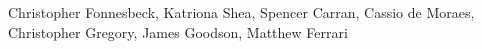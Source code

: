 Christopher Fonnesbeck, Katriona Shea, Spencer Carran, Cassio de Moraes, Christopher Gregory, James Goodson, Matthew Ferrari